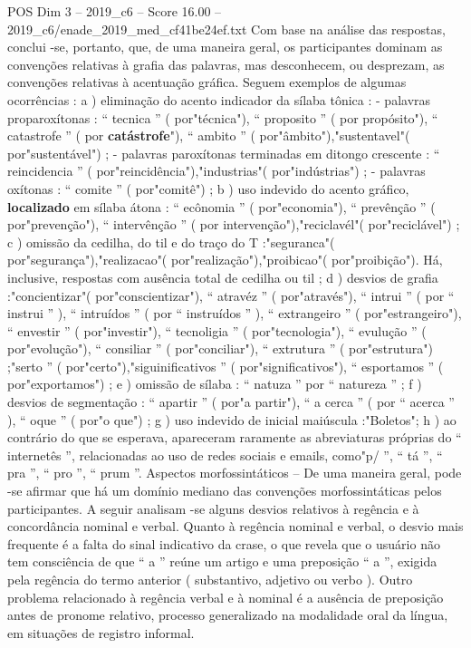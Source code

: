 \begin{textsample}{POS Dim 3 – 2019\_c6 – Score 16.00 – 2019\_c6/enade\_2019\_med\_cf41be24ef.txt}
Com base na análise das respostas, conclui -se, portanto, que, de uma maneira geral, os participantes dominam as convenções relativas à grafia das palavras, mas desconhecem, ou desprezam, as convenções relativas à acentuação gráfica.
Seguem exemplos de algumas ocorrências : a ) eliminação do acento indicador da sílaba tônica : - palavras proparoxítonas : “ tecnica ” ( por"técnica"), “ proposito ” ( por propósito"), “ catastrofe ” ( por \textbf{catástrofe}"), “ ambito ” ( por"âmbito"),"sustentavel"( por"sustentável") ; - palavras paroxítonas terminadas em ditongo crescente : “ reincidencia ” ( por"reincidência"),"industrias"( por"indústrias") ; - palavras oxítonas : “ comite ” ( por"comitê") ; b ) uso indevido do acento gráfico, \textbf{localizado} em sílaba átona : “ ecônomia ” ( por"economia"), “ prevênção ” ( por"prevenção"), “ intervênção ” ( por intervenção"),"reciclavél"( por"reciclável") ; c ) omissão da cedilha, do til e do traço do T :"seguranca"( por"segurança"),"realizacao"( por"realização"),"proibicao"( por"proibição").
Há, inclusive, respostas com ausência total de cedilha ou til ; d ) desvios de grafia :"concientizar"( por"conscientizar"), “ atravéz ” ( por"através"), “ intrui ” ( por “ instrui ” ), “ intruídos ” ( por “ instruídos ” ), “ extrangeiro ” ( por"estrangeiro"), “ envestir ” ( por"investir"), “ tecnoligia ” ( por"tecnologia"), “ evulução ” ( por"evolução"), “ consiliar ” ( por"conciliar"), “ extrutura ” ( por"estrutura") ;"serto ” ( por"certo"),"siguinificativos ” ( por"significativos"), “ esportamos ” ( por"exportamos") ; e ) omissão de sílaba : “ natuza ” por “ natureza ” ; f ) desvios de segmentação : “ apartir ” ( por"a partir"), “ a cerca ” ( por “ acerca ” ), “ oque ” ( por"o que") ; g ) uso indevido de inicial maiúscula :"Boletos"; h ) ao contrário do que se esperava, apareceram raramente as abreviaturas próprias do “ internetês ”, relacionadas ao uso de redes sociais e emails, como"p/ ”, “ tá ”, “ pra ”, “ pro ”, “ prum ”.
Aspectos morfossintáticos – De uma maneira geral, pode -se afirmar que há um domínio mediano das convenções morfossintáticas pelos participantes.
A seguir analisam -se alguns desvios relativos à regência e à concordância nominal e verbal.
Quanto à regência nominal e verbal, o desvio mais frequente é a falta do sinal indicativo da crase, o que revela que o usuário não tem consciência de que “ a ” reúne um artigo e uma preposição “ a ”, exigida pela regência do termo anterior ( substantivo, adjetivo ou verbo ).
Outro problema relacionado à regência verbal e à nominal é a ausência de preposição antes de pronome relativo, processo generalizado na modalidade oral da língua, em situações de registro informal.

\end{textsample}
